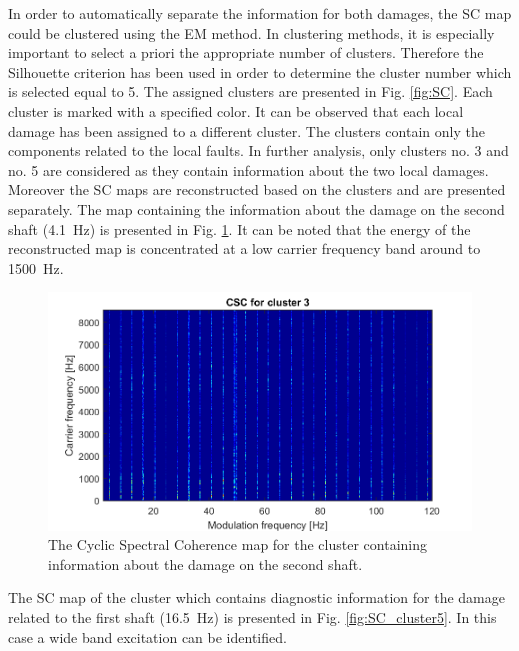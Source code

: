 \documentclass[11pt]{article}
\begin{document}
%
In order to automatically separate the information for both damages, the SC map could be clustered using the EM method. In clustering methods, it is especially important to select a priori the appropriate number of clusters. Therefore the Silhouette criterion has been used in order to determine the cluster number which is selected equal to 5. The assigned clusters are presented in Fig. \ref{fig:SC}. Each cluster is marked with a specified color. It can be observed that each local damage has been assigned to a different cluster. The clusters contain only the components related to the local faults. In further analysis, only clusters no. 3 and no. 5 are considered as they contain information about the two local damages. Moreover the SC maps are reconstructed based on the clusters and are presented separately. The map containing the information about the damage on the second shaft (4.1~Hz) is presented in Fig. \ref{fig: SC_cluster3}. It can be noted that the energy of the reconstructed map is concentrated at a low carrier frequency band around to 1500~Hz.
%
\begin{figure}[h!]
\begin{center}
\includegraphics[width=\textwidth]{wykresy/212_SC_cluster_3.png}
\caption{The Cyclic Spectral Coherence map for the cluster containing information about the damage on the second shaft.}
\label{fig: SC_cluster3}
\end{center}
\end{figure}
%
The SC map of the cluster which contains diagnostic information for the damage related to the first shaft (16.5~Hz) is presented in Fig. \ref{fig:SC_cluster5}. In this case a wide band excitation can be identified. 
\end{document}
